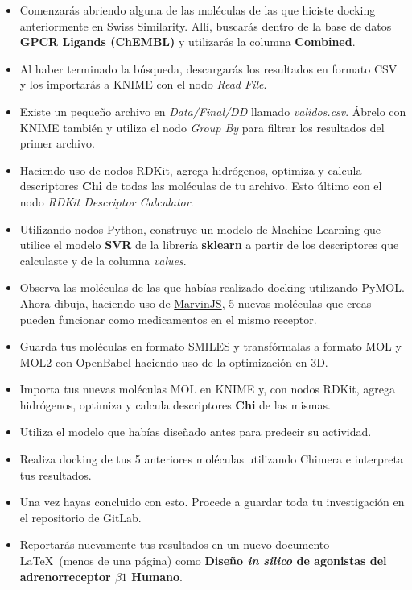 \documentclass[10pt,letterpaper]{article}
\begin{document}
\begin{itemize}
\item Comenzar\'as abriendo alguna de las mol\'eculas de las que hiciste docking anteriormente en Swiss Similarity. All\'i, buscar\'as dentro de la base de datos \textbf{GPCR Ligands (ChEMBL)} y utilizar\'as la columna \textbf{Combined}.
\item Al haber terminado la b\'usqueda, descargar\'as los resultados en formato CSV y los importar\'as a KNIME con el nodo \textit{Read File}.
\item Existe un peque\~no archivo en \textit{Data/Final/DD} llamado \textit{validos.csv}. \'Abrelo con KNIME tambi\'en y utiliza el nodo \textit{Group By} para filtrar los resultados del primer archivo.
\item Haciendo uso de nodos RDKit, agrega hidr\'ogenos, optimiza y calcula descriptores \textbf{Chi} de todas las mol\'eculas de tu archivo. Esto \'ultimo con el nodo \textit{RDKit Descriptor Calculator}.
\item Utilizando nodos Python, construye un modelo de Machine Learning que utilice el modelo \textbf{SVR} de la librer\'ia \textbf{sklearn} a partir de los descriptores que calculaste y de la columna \textit{values}.
\item Observa las mol\'eculas de las que hab\'ias realizado docking utilizando PyMOL. Ahora dibuja, haciendo uso de \href{https://marvinjs-demo.chemaxon.com/latest/demo.html}{MarvinJS}, 5 nuevas mol\'eculas que creas pueden funcionar como medicamentos en el mismo receptor.
\item Guarda tus mol\'eculas en formato SMILES y transf\'ormalas a formato MOL y MOL2 con OpenBabel haciendo uso de la optimizaci\'on en 3D.
\item Importa tus nuevas mol\'eculas MOL en KNIME y, con nodos RDKit, agrega hidr\'ogenos, optimiza y calcula descriptores \textbf{Chi} de las mismas.
\item Utiliza el modelo que hab\'ias dise\~nado antes para predecir su actividad.
\item Realiza docking de tus 5 anteriores mol\'eculas utilizando Chimera e interpreta tus resultados.
\item Una vez hayas concluido con esto. Procede a guardar toda tu investigaci\'on en el repositorio de GitLab.
\item Reportar\'as nuevamente tus resultados en un nuevo documento \LaTeX\ (menos de una p\'agina) como \textbf{Dise\~no \emph{in silico} de agonistas del adrenorreceptor $\beta 1$ Humano}.
\end{itemize}
\end{document}
